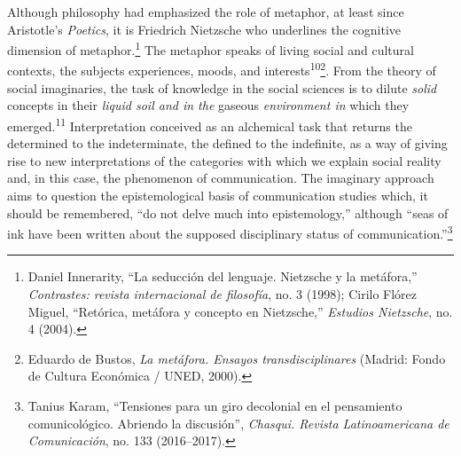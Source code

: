 \documentclass{tufte-handout}
\begin{document}
Although philosophy had emphasized the role of metaphor, at least since
Aristotle's \emph{Poetics}, it is Friedrich Nietzsche who underlines the
cognitive dimension of metaphor.\footnote{Daniel Innerarity, ``La
  seducción del lenguaje. Nietzsche y la metáfora,'' \emph{Contrastes:
  revista internacional de filosofía}, no. 3 (1998); Cirilo Flórez
  Miguel, ``Retórica, metáfora y concepto en Nietzsche,'' \emph{Estudios
  Nietzsche}, no. 4 (2004).} The metaphor speaks of living social and
cultural contexts, the subjects\textquotesingle{} experiences, moods,
and interests\textsuperscript{10}\footnote{Eduardo de Bustos, \emph{La metáfora. Ensayos
  transdisciplinares} (Madrid: Fondo de Cultura Económica / UNED, 2000).}.
From the theory of social imaginaries, the task of knowledge in the
social sciences is to dilute \emph{solid} concepts in their \emph{liquid
soil and in the} gaseous \emph{environment in} which they
emerged.\textsuperscript{11} Interpretation conceived
as an alchemical task that returns the determined to the indeterminate,
the defined to the indefinite, as a way of giving rise to new
interpretations of the categories with which we explain social reality
and, in this case, the phenomenon of communication. The imaginary
approach aims to question the epistemological basis of communication
studies which, it should be remembered, ``do not delve much into
epistemology,'' although ``seas of ink have been written about the
supposed disciplinary status of communication.''\footnote{Tanius Karam,
  ``Tensiones para un giro decolonial en el pensamiento comunicológico.
  Abriendo la discusión'', \emph{Chasqui. Revista Latinoamericana de
  Comunicación}, no. 133 (2016--2017).}
\end{document}
